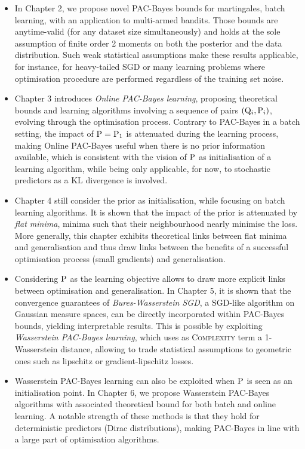 \begin{itemize}
  \item In Chapter 2, we propose novel PAC-Bayes bounds for martingales, batch learning, with an application to multi-armed bandits. Those bounds are anytime-valid (\ie for any dataset size simultaneously) and holds at the sole assumption of finite order 2 moments on both the posterior and the data distribution. Such weak statistical assumptions make these results applicable, for instance, for heavy-tailed SGD or many learning problems where optimisation procedure are performed regardless of the training set noise.
  \item Chapter 3 introduces \emph{Online PAC-Bayes learning}, proposing theoretical bounds and learning algorithms involving a sequence of pairs $(\Q_i,\P_i)$, evolving through the optimisation process. Contrary to PAC-Bayes in a batch setting, the impact of $\P=\P_1$ is attenuated during the learning process, making Online PAC-Bayes useful when there is no prior information available, which is consistent with the vision of $\P$ as initialisation of a learning algorithm, while being only applicable, for now, to stochastic predictors as a KL divergence is involved.
  \item Chapter 4 still consider the prior as initialisation, while focusing on batch learning algorithms. It is shown that the impact of the prior is attenuated by \emph{flat minima}, \ie minima such that their neighbourhood nearly minimise the loss. More generally, this chapter exhibits theoretical links between flat minima and generalisation and thus draw links between the benefits of a successful optimisation process (small gradients) and generalisation.
  \item Considering $\P$ as the learning objective allows to draw more explicit links between optimisation and generalisation. In Chapter 5, it is shown that the convergence guarantees of \emph{Bures-Wasserstein SGD}, a SGD-like algorithm on Gaussian measure spaces, can be directly incorporated within PAC-Bayes bounds, yielding interpretable results. This is possible by exploiting \emph{Wasserstein PAC-Bayes learning}, which uses as \textsc{Complexity} term a 1-Wasserstein distance, allowing to trade statistical assumptions to geometric ones such as lipschitz or gradient-lipschitz losses. 
  \item Wasserstein PAC-Bayes learning can also be exploited when $\P$ is seen as an initialisation point. In Chapter 6, we propose Wasserstein PAC-Bayes algorithms with associated theoretical bound for both batch and online learning. A notable strength of these methods is that they hold for deterministic predictors (Dirac distributions), making PAC-Bayes in line with a large part of optimisation algorithms.
\end{itemize}

